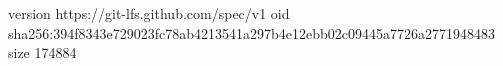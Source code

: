 version https://git-lfs.github.com/spec/v1
oid sha256:394f8343e729023fc78ab4213541a297b4e12ebb02c09445a7726a2771948483
size 174884
